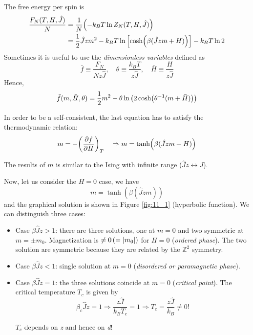 \documentclass[../main/main.tex]{subfiles}
\begin{document}
The free energy per spin is
\begin{equation*}
\begin{split}
  \frac{F_N (T,H,\hat{J} )}{N} & = \frac{1}{N} \qty(-k_B T \ln{Z_N(T,H,\hat{J} )} ) \\
  & = \frac{1}{2} \hat{J} z m^2 - k_B T \ln{\qty[\cosh(\beta (\hat{J}zm+H ))] } - k_B T \ln{2}
\end{split}
\end{equation*}
Sometimes it is useful to use the \emph{dimensionless variables} defined as
\begin{equation}
  \bar{f} \equiv \frac{F_N}{N z \hat{J} }, \quad \theta \equiv \frac{k_B T}{z \hat{J} }, \quad \bar{H} \equiv \frac{H}{z \hat{J} }
\end{equation}
Hence,
\begin{equation}
  \bar{f} (m, \bar{H}, \theta  ) = \frac{1}{2}m^2 - \theta \ln{\qty(2 \cosh (\theta ^{-1}(m+\bar{H} ))) }
\end{equation}

In order to be a self-consistent, the last equation has to satisfy the  thermodynamic relation:
\begin{equation*}
  m = - \qty( \pdv{f}{H})_T \quad \Rightarrow   m = \tanh (\beta (\hat{J}z m + H  ))
\end{equation*}
\begin{remark}
The results of \( m \)  is similar to the Ising with infinite range (\( \hat{J}z \leftrightarrow J  \)).
\end{remark}

Now, let us consider the \( H=0 \) case, we have
\begin{equation}
  m =  \tanh (\beta (\hat{J}z m ))
\end{equation}
and the graphical solution is shown in Figure \ref{fig:11_1} (hyperbolic function).
We can distinguish three cases:
\begin{itemize}
\item Case \( \beta \hat{J} z > 1  \): there are three solutions, one at \( m=0 \) and two symmetric at \( m=\pm m_0 \). Magnetization is \( \neq 0 \, (= \abs{m_0} )\) for \( H=0 \) (\emph{ordered phase}).  The two solution are symmetric because they are related by the \( \mathbb{Z}^2 \)  symmetry.
\item Case \( \beta \hat{J} z < 1  \): single solution at \( m=0 \) (\emph{disordered or paramagnetic phase}).
\item Case \( \beta \hat{J} z = 1  \): the three solutions coincide at \( m=0 \) (\emph{critical point}). 
The critical temperature \( T_c \) is given by
\begin{equation*}
 \beta_c \hat{J} z = 1 \Rightarrow  \frac{z \hat{J} }{k_B T_c} = 1 \Rightarrow T_c = \frac{z \hat{J} }{k_B} \neq 0!
\end{equation*}
\begin{remark}
\( T_c \) depends on \emph{z} and hence on \emph{d}!
\end{remark}
\end{itemize}
\end{document}
